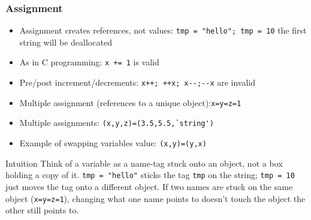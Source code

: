 \begin{frame}[fragile]  \frametitle{Assignment}
\begin{itemize}
\item Assignment creates references, not values:
\lstinline{tmp = "hello"; tmp = 10}
the first string will be deallocated
\item As in C programming: \lstinline{x += 1} is valid
\item Pre/post increment/decrements: \lstinline{x++; ++x; x--;--x} are invalid
\item Multiple assignment (references to a unique object):\lstinline{x=y=z=1}
\item Multiple assignments: \lstinline{(x,y,z)=(3.5,5.5,`string')}
\item  Example of swapping variables value: \lstinline{(x,y)=(y,x)}
\end{itemize}
\begin{block}{Intuition}
Think of a variable as a name-tag stuck onto an object, not a box holding a copy of it. \lstinline{tmp = "hello"} sticks the tag \lstinline{tmp} on the string; \lstinline{tmp = 10} just moves the tag onto a different object. If two names are stuck on the same object (\lstinline{x=y=z=1}), changing what one name points to doesn't touch the object the other still points to.
\end{block}
\end{frame}


